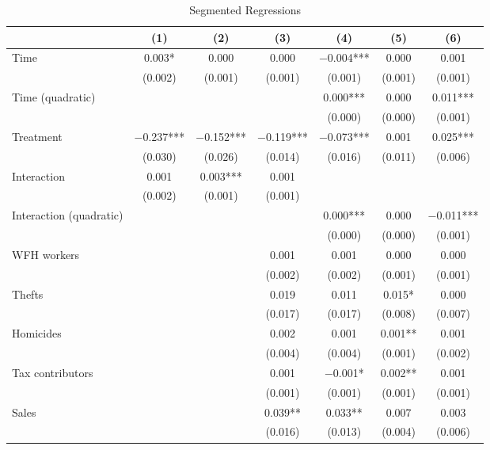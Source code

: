 \documentclass[11pt,a4paper]{article}\usepackage[]{graphicx}\usepackage[]{xcolor}
\begin{document}
\begin{table}[htbp!]
\caption{Segmented Regressions}
\label{tab:regseg}

\begin{tabular}[t]{lcccccc}
\toprule
  & (1) & (2) & (3) & (4) & (5) & (6)\\
\midrule
Time & \num{0.003}* & \num{0.000} & \num{0.000} & \num{-0.004}*** & \num{0.000} & \num{0.001}\\
 & (\num{0.002}) & (\num{0.001}) & (\num{0.001}) & (\num{0.001}) & (\num{0.001}) & (\num{0.001})\\
Time (quadratic) &  &  &  & \num{0.000}*** & \num{0.000} & \num{0.011}***\\
 &  &  &  & (\num{0.000}) & (\num{0.000}) & \vphantom{1} (\num{0.001})\\
Treatment & \num{-0.237}*** & \num{-0.152}*** & \num{-0.119}*** & \num{-0.073}*** & \num{0.001} & \num{0.025}***\\
 & (\num{0.030}) & (\num{0.026}) & (\num{0.014}) & (\num{0.016}) & (\num{0.011}) & (\num{0.006})\\
Interaction & \num{0.001} & \num{0.003}*** & \num{0.001} &  &  & \\
 & (\num{0.002}) & (\num{0.001}) & (\num{0.001}) &  &  & \\
Interaction (quadratic) &  &  &  & \num{0.000}*** & \num{0.000} & \num{-0.011}***\\
 &  &  &  & (\num{0.000}) & (\num{0.000}) & (\num{0.001})\\
WFH workers &  &  & \num{0.001} & \num{0.001} & \num{0.000} & \num{0.000}\\
 &  &  & (\num{0.002}) & (\num{0.002}) & (\num{0.001}) & (\num{0.001})\\
Thefts &  &  & \num{0.019} & \num{0.011} & \num{0.015}* & \num{0.000}\\
 &  &  & (\num{0.017}) & (\num{0.017}) & (\num{0.008}) & (\num{0.007})\\
Homicides &  &  & \num{0.002} & \num{0.001} & \num{0.001}** & \num{0.001}\\
 &  &  & (\num{0.004}) & (\num{0.004}) & (\num{0.001}) & (\num{0.002})\\
Tax contributors &  &  & \num{0.001} & \num{-0.001}* & \num{0.002}** & \num{0.001}\\
 &  &  & (\num{0.001}) & (\num{0.001}) & (\num{0.001}) & (\num{0.001})\\
Sales &  &  & \num{0.039}** & \num{0.033}** & \num{0.007} & \num{0.003}\\
 &  &  & (\num{0.016}) & (\num{0.013}) & (\num{0.004}) & (\num{0.006})\\

\end{tabular}
\end{table}
\end{document}
